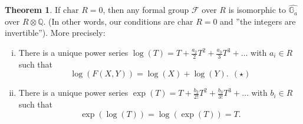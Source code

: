 \documentclass{article}
\theoremstyle{definition}
\newtheorem{theorem}{Theorem}[section]
\begin{document}
\begin{theorem}\label{theorem8.3}
    If $\text{char }R = 0$, then any formal group $\mathcal{F}$ over $R$ is isomorphic to $\widehat{\mathbb{G}_a}$ over $R \otimes \mathbb{Q}$. (In other words, our conditions are $\text{char }R = 0$ and ''the integers are invertible''). More precisely:
    \begin{enumerate}[(i)]
        \item There is a unique power series $\log(T) = T + \frac{a_2}{2}T^2 + \frac{a_3}{3}T^3 + \ldots$ with $a_i \in R$ such that 
        \[
        \log(F(X,Y)) = \log(X) + \log(Y).~~ (\star)
        \]
        \item There is a unique power series $\exp(T) = T + \frac{b_2}{2!}T^2 + \frac{b_3}{3!}T^3 + \ldots$ with $b_i \in R$ such that \[
        \exp(\log(T)) = \log(\exp(T)) = T.
        \]
    \end{enumerate}
\end{theorem}
\end{document}
